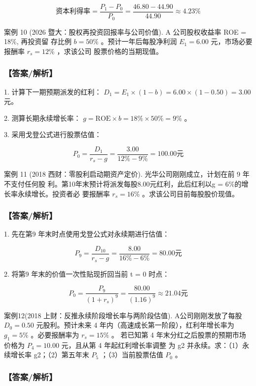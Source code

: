 \documentclass[lang=cn,10pt,color=blue]{elegantbook}
\begin{document}
$$
\text{资本利得率} = \frac {P _ {1} - P _ {0}}{P _ {0}} = \frac {46.80 - 44.90}{44.90} \approx 4.23\%
$$

案例 10 (2026  暨大：股权再投资回报率与公司价值). A 公司股权收益率 ROE = 18\%, 再投资留 存比例 $b = 5 0 \%$ 。预计一年后每股净利润 $E _ { 1 } = 6 . 0 0$ 元，市场必要报酬率 $r _ { s } = 1 2 \%$ ，求该公司 股票价格的当期现值。 

\subsubsection{【答案/解析】}

1. 计算下一期预期派发的红利： $D_1 = E_1 \times ( 1 - b ) = 6.00 \times ( 1 - 0.50 ) = 3.00$ 元。 

2. 测算长期永续增长率： $g = \mathrm { R O E } \times b = 1 8 \% \times 5 0 \% = 9 \%$ 。 

3. 采用戈登公式进行股票估值： 

$$
P _ {0} = \frac {D _ {1}}{r _ {s} - g} = \frac {3 . 0 0}{12 \% - 9 \%} = 1 0 0. 0 0 \text{元}
$$

案例 11 (2018  西财：零股利启动期资产定价). 光华公司刚刚成立，计划在前 9 年不支付任何股 利。第10年末预计将派发每股8.00元红利，此后红利以g = 6\%的增长率永续增长。投资者必 要报酬率 $r _ { s } = 1 6 \%$ 。求该公司目前每股股价现值。 

\subsubsection{【答案/解析】}

1. 先在第9 年末时点使用戈登公式对永续期进行估值： 

$$
P _ {9} = \frac {D _ {1 0}}{r _ {s} - g} = \frac {8 . 0 0}{16 \% - 6 \%} = 80. 0 0 \text {元}
$$

2. 将第9 年末的价值一次性贴现折回当前 t = 0 时点： 

$$
P _ {0} = \frac {P _ {9}}{(1 + r _ {s}) ^ {9}} = \frac {8 0 . 0 0}{(1 . 1 6) ^ {9}} \approx 2 1. 0 4 \text {元}
$$

案例12(2018 上财：反推永续阶段增长率与两阶段估值). A公司刚刚发放了每股 $D_0 = 0.50$ 元股利。预计未来 4 年内（高速成长第一阶段），红利年增长率为 $g _ { 1 } = 5 \%$ 。必要报酬率为 $r _ { s } = 1 5 \%$ 。 若已知第 4 年末分红之后股票的预期市场价格为 $P_4 = 10.00$ 元，且从第 4 年起红利增长率调整 为 g2 并永续。求：（1）永续增长率 g2；（2）第五年末 $P _ { 5 }$ ；（3）当前股票估值 $P _ { 0 }$ 。 

\subsubsection{【答案/解析】}
\end{document}
